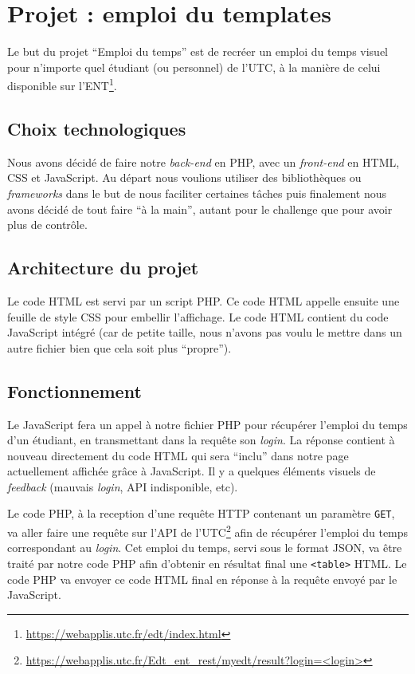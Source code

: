 \chapter{Projet : emploi du templates}

Le but du projet ``Emploi du temps'' est de recréer un emploi du temps visuel pour n'importe quel étudiant (ou personnel) de l'UTC, à la manière de celui disponible sur l'ENT\footnote{\url{https://webapplis.utc.fr/edt/index.html}}.

\section{Choix technologiques}

Nous avons décidé de faire notre \textit{back-end} en PHP, avec un \textit{front-end} en HTML, CSS et JavaScript. Au départ nous voulions utiliser des bibliothèques ou \textit{frameworks} dans le but de nous faciliter certaines tâches puis finalement nous avons décidé de tout faire ``à la main'', autant pour le challenge que pour avoir plus de contrôle.

\section{Architecture du projet}

Le code HTML est servi par un script PHP. Ce code HTML appelle ensuite une feuille de style CSS pour embellir l'affichage. Le code HTML contient du code JavaScript intégré (car de petite taille, nous n'avons pas voulu le mettre dans un autre fichier bien que cela soit plus ``propre'').

\section{Fonctionnement}

Le JavaScript fera un appel à notre fichier PHP pour récupérer l'emploi du temps d'un étudiant, en transmettant dans la requête son \textit{login}. La réponse contient à nouveau directement du code HTML qui sera ``inclu'' dans notre page actuellement affichée grâce à JavaScript. Il y a quelques éléments visuels de \textit{feedback} (mauvais \textit{login}, API indisponible, etc).

\medskip

Le code PHP, à la reception d'une requête HTTP contenant un paramètre \lstinline{GET}, va aller faire une requête sur l'API de l'UTC\footnote{\url{https://webapplis.utc.fr/Edt_ent_rest/myedt/result?login=<login>}} afin de récupérer l'emploi du temps correspondant au \textit{login}. Cet emploi du temps, servi sous le format JSON, va être traité par notre code PHP afin d'obtenir en résultat final une \lstinline{<table>} HTML. Le code PHP va envoyer ce code HTML final en réponse à la requête envoyé par le JavaScript.

